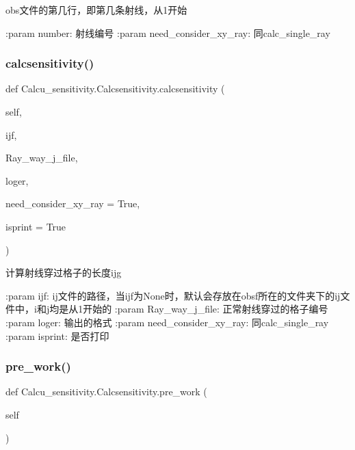 \begin{DoxyVerb}obs文件的第几行，即第几条射线，从1开始

:param number: 射线编号
:param need_consider_xy_ray: 同calc_single_ray
\end{DoxyVerb}
 \mbox{\label{classCalcu__sensitivity_1_1Calcsensitivity_aede00bb6135485d40e67980414bf1ebc}} 
\subsubsection{\texorpdfstring{calcsensitivity()}{calcsensitivity()}}
{\footnotesize\ttfamily def Calcu\+\_\+sensitivity.\+Calcsensitivity.\+calcsensitivity (\begin{DoxyParamCaption}\item[{}]{self,  }\item[{}]{ijf,  }\item[{}]{Ray\+\_\+way\+\_\+j\+\_\+file,  }\item[{}]{loger,  }\item[{}]{need\+\_\+consider\+\_\+xy\+\_\+ray = {\ttfamily True},  }\item[{}]{isprint = {\ttfamily True} }\end{DoxyParamCaption})}

\begin{DoxyVerb}计算射线穿过格子的长度ijg

:param ijf: ij文件的路径，当ijf为None时，默认会存放在obsf所在的文件夹下的ij文件中，i和j均是从1开始的
:param Ray_way_j_file: 正常射线穿过的格子编号
:param loger: 输出的格式
:param need_consider_xy_ray: 同calc_single_ray
:param isprint: 是否打印
\end{DoxyVerb}
 \mbox{\label{classCalcu__sensitivity_1_1Calcsensitivity_a4b1fd897d17dde2abc328282bb4df5d2}} 
\subsubsection{\texorpdfstring{pre\+\_\+work()}{pre\_work()}}
{\footnotesize\ttfamily def Calcu\+\_\+sensitivity.\+Calcsensitivity.\+pre\+\_\+work (\begin{DoxyParamCaption}\item[{}]{self }\end{DoxyParamCaption})}

